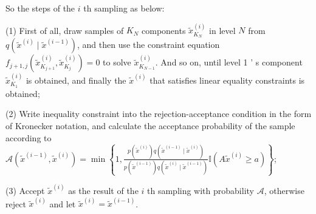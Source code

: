 \documentclass[11pt]{article}
\begin{document}
So the steps of the $i$ th sampling as below:

(1) First of all, draw samples of $K_{N}$ components $\tilde{x}_{K_{N}}^{(i)}$ in level $N$ from $q\left(\tilde{x}^{(i)} \mid \tilde{x}^{(i-1)}\right)$, and then use the constraint equation $f_{j+1, j}\left(\tilde{x}_{K_{j+1}}^{(i)}, \tilde{x}_{K_{j}}^{(i)}\right)=0$ to solve $\tilde{x}_{K_{N-1}}^{(i)}$. And so on, until level 1 ' s component $\tilde{x}_{K_{1}}^{(i)}$ is obtained, and finally the $\tilde{x}^{(i)}$ that satisfies linear equality constraints is obtained;

(2) Write inequality constraint into the rejection-acceptance condition in the form of Kronecker notation, and calculate the acceptance probability of the sample according to $\mathcal{A}\left(\tilde{x}^{(i-1)}, \tilde{x}^{(i)}\right)=\min \left\{1, \frac{p\left(\tilde{x}^{(i)}\right) q\left(\tilde{x}^{(i-1)} \mid \tilde{x}^{(i)}\right)}{p\left(\tilde{x}^{(i-1)}\right) q\left(\tilde{x}^{(i)} \mid \tilde{x}^{(i-1)}\right)} \mathbb{I}\left(A \tilde{x}^{(i)} \geq a\right)\right\}$;

(3) Accept $\tilde{x}^{(i)}$ as the result of the $i$ th sampling with probability $\mathcal{A}$, otherwise reject $\tilde{x}^{(i)}$ and let $\tilde{x}^{(i)}=\tilde{x}^{(i-1)}$.
\end{document}

